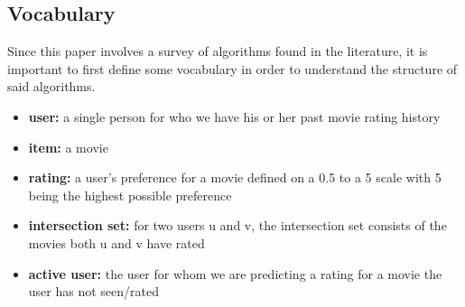 \documentclass[11pt,letterpaper]{article}
\begin{document}
\subsection{Vocabulary}
Since this paper involves a survey of algorithms found in the literature, it is important to first define some vocabulary in order to understand the structure of said algorithms.
\begin{itemize}
    \item \textbf{user:} a single person for who we have his or her past movie rating history
    \item \textbf{item:} a movie
    \item \textbf{rating:} a user's preference for a movie defined on a 0.5 to a 5 scale with 5 being the highest possible preference
    \item \textbf{intersection set:} for two users u and v, the intersection set consists of the movies both u and v have rated
    \item \textbf{active user:} the user for whom we are predicting a rating for a movie the user has not seen/rated
\end{itemize}
\end{document}
